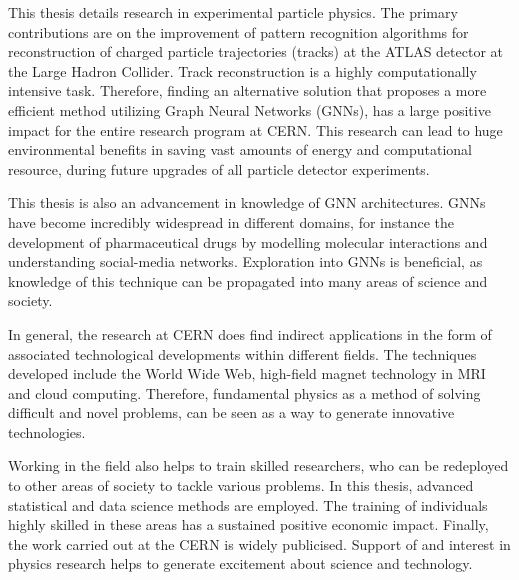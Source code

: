 This thesis details research in experimental particle physics. The primary contributions are on the improvement of pattern recognition algorithms for reconstruction of charged particle trajectories (tracks) at the ATLAS detector at the Large Hadron Collider. Track reconstruction is a highly computationally intensive task. Therefore, finding an alternative solution that proposes a more efficient method utilizing Graph Neural Networks (GNNs), has a large positive impact for the entire research program at CERN. This research can lead to huge environmental benefits in saving vast amounts of energy and computational resource, during future upgrades of all particle detector experiments.

This thesis is also an advancement in knowledge of GNN architectures. GNNs have become incredibly widespread in different domains, for instance the development of pharmaceutical drugs by modelling molecular interactions and understanding social-media networks. Exploration into GNNs is beneficial, as knowledge of this technique can be propagated into many areas of science and society.

In general, the research at CERN does find indirect applications in the form of associated technological developments within different fields. The techniques developed include the World Wide Web, high-field magnet technology in MRI and cloud computing. Therefore, fundamental physics as a method of solving difficult and novel problems, can be seen as a way to generate innovative technologies.

Working in the field also helps to train skilled researchers, who can be redeployed to other areas of society to tackle various problems. In this thesis, advanced statistical and data science methods are employed. The training of individuals highly skilled in these areas has a sustained positive economic impact. Finally, the work carried out at the CERN is widely publicised. Support of and interest in physics research helps to generate excitement about science and technology.
